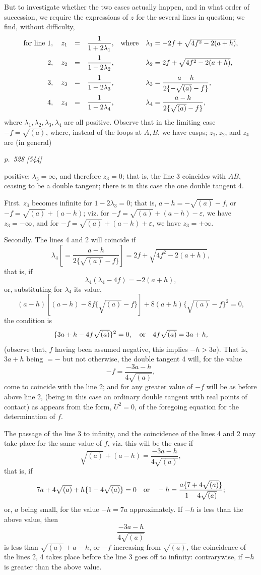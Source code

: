 \documentclass[11pt,a4paper]{article}
\theoremstyle{plain}
\theoremstyle{definition}
\newcommand{\sourcepage}[2]{%
  \bigskip
  \noindent\textit{p.~#1 [#2]}%
  \par\smallskip
}
\begin{document}
But to investigate whether the two cases actually happen, and in what order
of succession, we require the expressions of $z$ for the several lines in
question; we find, without difficulty,
\[
\begin{array}{rclcl}
\hbox{for line }1,\quad
z_1&=&\dfrac{1}{1+2\lambda_1},&
\hbox{where}& \lambda_1=-2f+\sqrt{4f^2-2(a+h)},\\[1.1em]
2,\quad
z_2&=&\dfrac{1}{1-2\lambda_2},&&
\lambda_2=2f+\sqrt{4f^2-2(a+h)},\\[1.1em]
3,\quad
z_3&=&\dfrac{1}{1-2\lambda_3},&&
\lambda_3=\dfrac{a-h}{2\{-\sqrt{(a)}-f\}},\\[1.1em]
4,\quad
z_4&=&\dfrac{1}{1-2\lambda_4},&&
\lambda_4=\dfrac{a-h}{2\{\sqrt{(a)}-f\}},
\end{array}
\]
where $\lambda_1,\lambda_2,\lambda_3,\lambda_4$ are all positive. Observe
that in the limiting case $-f=\sqrt{(a)}$, where, instead of the loops at
$A,B$, we have cusps; $z_1,z_2$, and $z_4$ are (in general)

\clearpage

\sourcepage{528}{544}
positive; $\lambda_3=\infty$, and therefore $z_3=0$; that is, the line 3
coincides with $AB$, ceasing to be a double tangent; there is in this case
the one double tangent 4.

First. $z_3$ becomes infinite for $1-2\lambda_3=0$; that is,
$a-h=-\sqrt{(a)}-f$, or $-f=\sqrt{(a)}+(a-h)$; viz. for
$-f=\sqrt{(a)}+(a-h)-\varepsilon$, we have $z_3=-\infty$, and for
$-f=\sqrt{(a)}+(a-h)+\varepsilon$, we have $z_3=+\infty$.

Secondly. The lines 4 and 2 will coincide if
\[
\lambda_4\left[=\frac{a-h}{2\{\sqrt{(a)}-f\}}\right]
=2f+\sqrt{4f^2-2(a+h)},
\]
that is, if
\[
\lambda_4(\lambda_4-4f)=-2(a+h),
\]
or, substituting for $\lambda_4$ its value,
\[
(a-h)[(a-h)-8f\{\sqrt{(a)}-f\}]
+8(a+h)\{\sqrt{(a)}-f\}^2=0,
\]
the condition is
\[
\{3a+h-4f\sqrt{(a)}\}^2=0,\quad
\hbox{or}\quad 4f\sqrt{(a)}=3a+h,
\]
(observe that, $f$ having been assumed negative, this implies $-h>3a$).
That is, $3a+h$ being $=-$ but not otherwise, the double tangent 4 will, for
the value
\[
-f=\frac{-3a-h}{4\sqrt{(a)}},
\]
come to coincide with the line 2; and for any greater value of $-f$ will be
as before above line 2, (being in this case an ordinary double tangent with
real points of contact) as appears from the form, $U^2=0$, of the foregoing
equation for the determination of $f$.

The passage of the line 3 to infinity, and the coincidence of the lines 4
and 2 may take place for the same value of $f$, viz. this will be the case if
\[
\sqrt{(a)}+(a-h)=\frac{-3a-h}{4\sqrt{(a)}},
\]
that is, if
\[
7a+4\sqrt{(a)}+h\{1-4\sqrt{(a)}\}=0\quad
\hbox{or}\quad
-h=\frac{a\{7+4\sqrt{(a)}\}}{1-4\sqrt{(a)}};
\]
or, $a$ being small, for the value $-h=7a$ approximately. If $-h$ is less
than the above value, then
\[
\frac{-3a-h}{4\sqrt{(a)}}
\]
is less than $\sqrt{(a)}+a-h$, or $-f$ increasing from $\sqrt{(a)}$, the
coincidence of the lines 2, 4 takes place before the line 3 goes off to
infinity: contrarywise, if $-h$ is greater than the above value.
\end{document}
